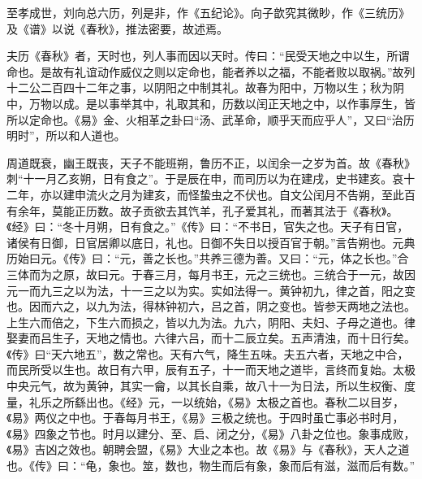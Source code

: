 \documentclass[12pt,UTF8]{ctexbook}
\begin{document}
至孝成世，刘向总六历，列是非，作《五纪论》。向子歆究其微眇，作《三统历》及《谱》以说《春秋》，推法密要，故述焉。



夫历《春秋》者，天时也，列人事而因以天时。传曰：“民受天地之中以生，所谓命也。是故有礼谊动作威仪之则以定命也，能者养以之福，不能者败以取祸。”故列十二公二百四十二年之事，以阴阳之中制其礼。故春为阳中，万物以生；秋为阴中，万物以成。是以事举其中，礼取其和，历数以闰正天地之中，以作事厚生，皆所以定命也。《易》金、火相革之卦曰“汤、武革命，顺乎天而应乎人”，又曰“治历明时”，所以和人道也。



周道既衰，幽王既丧，天子不能班朔，鲁历不正，以闰余一之岁为首。故《春秋》刺“十一月乙亥朔，日有食之”。于是辰在申，而司历以为在建戌，史书建亥。哀十二年，亦以建申流火之月为建亥，而怪蛰虫之不伏也。自文公闰月不告朔，至此百有余年，莫能正历数。故子贡欲去其饩羊，孔子爱其礼，而著其法于《春秋》。《经》曰：“冬十月朔，日有食之。”《传》曰：“不书日，官失之也。天子有日官，诸侯有日御，日官居卿以底日，礼也。日御不失日以授百官于朝。”言告朔也。元典历始曰元。《传》曰：“元，善之长也。”共养三德为善。又曰：“元，体之长也。”合三体而为之原，故曰元。于春三月，每月书王，元之三统也。三统合于一元，故因元一而九三之以为法，十一三之以为实。实如法得一。黄钟初九，律之首，阳之变也。因而六之，以九为法，得林钟初六，吕之首，阴之变也。皆参天两地之法也。上生六而倍之，下生六而损之，皆以九为法。九六，阴阳、夫妇、子母之道也。律娶妻而吕生子，天地之情也。六律六吕，而十二辰立矣。五声清浊，而十日行矣。《传》曰“天六地五”，数之常也。天有六气，降生五味。夫五六者，天地之中合，而民所受以生也。故日有六甲，辰有五子，十一而天地之道毕，言终而复始。太极中央元气，故为黄钟，其实一龠，以其长自乘，故八十一为日法，所以生权衡、度量，礼乐之所繇出也。《经》元，一以统始，《易》太极之首也。春秋二以目岁，《易》两仪之中也。于春每月书王，《易》三极之统也。于四时虽亡事必书时月，《易》四象之节也。时月以建分、至、启、闭之分，《易》八卦之位也。象事成败，《易》吉凶之效也。朝聘会盟，《易》大业之本也。故《易》与《春秋》，天人之道也。《传》曰：“龟，象也。筮，数也，物生而后有象，象而后有滋，滋而后有数。”
\end{document}
